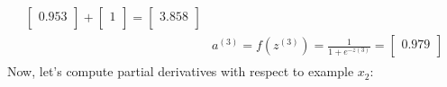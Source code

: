 \documentclass[leqno]{article}
\begin{document}
\begin{gather*}
\begin{split}
\begin{bmatrix}
   0.953\\ 
  \end{bmatrix} 
  +
   \begin{bmatrix}
   1\\
  \end{bmatrix}
  =
 \begin{bmatrix}
   3.858\\ 
  \end{bmatrix}
\\
&a^{(3)} = f(z^{(3)}) = \frac{1}{1 + e^{-z{(3)}}} =
 \begin{bmatrix}
   0.979\\ 
  \end{bmatrix}
\end{split}
\end{gather*}
Now, let's compute partial derivatives with respect to example $x_2$:
\end{document}
